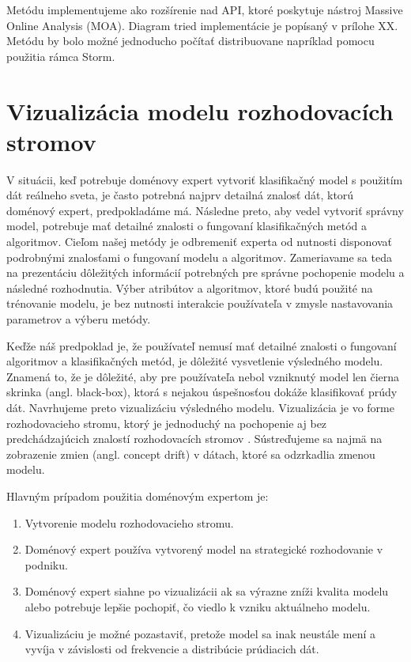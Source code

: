\par
Metódu implementujeme ako rozšírenie nad API, ktoré poskytuje nástroj Massive Online Analysis (MOA). Diagram tried implementácie je popísaný v prílohe XX.%
  Metódu by bolo možné jednoducho počítať distribuovane napríklad pomocu použitia rámca Storm.


\chapter{Vizualizácia modelu rozhodovacích stromov}
\label{my-method-prezentacia-vysledkov}
V situácii, keď potrebuje doménovy expert vytvoriť klasifikačný model s použitím dát reálneho sveta, je často potrebná najprv detailná znalosť dát, ktorú doménový expert, predpokladáme má.  Následne preto, aby vedel vytvoriť správny model, potrebuje mať detailné znalosti o fungovaní klasifikačných metód a algoritmov. Cieľom našej metódy je odbremeniť experta od nutnosti disponovať podrobnými znalosťami o fungovaní modelu a algoritmov. Zameriavame sa teda na prezentáciu dôležitých informácií potrebných pre správne pochopenie modelu a následné rozhodnutia. Výber atribútov a algoritmov, ktoré budú použité na trénovanie modelu, je bez nutnosti interakcie používateľa v zmysle nastavovania parametrov a výberu metódy. 
\par
Keďže náš predpoklad je, že používateľ nemusí mať detailné znalosti o fungovaní algoritmov a klasifikačných metód, je dôležité vysvetlenie výsledného modelu. Znamená to, že je dôležité, aby pre používateľa nebol vzniknutý model len čierna skrinka (angl. black-box), ktorá s nejakou úspešnosťou dokáže klasifikovať prúdy dát. Navrhujeme preto vizualizáciu výsledného modelu. Vizualizácia je vo forme rozhodovacieho stromu, ktorý je jednoduchý na pochopenie aj bez predchádzajúcich znalostí rozhodovacích stromov \citep{nguyen2015survey}. Sústreďujeme sa najmä na zobrazenie zmien (angl. concept drift) v dátach, ktoré sa odzrkadlia zmenou modelu.
\par
Hlavným prípadom použitia doménovým expertom je:
\begin{enumerate}
	\item Vytvorenie modelu rozhodovacieho stromu.
	\item Doménový expert používa vytvorený model na strategické rozhodovanie v podniku.
	\item Doménový expert siahne po vizualizácii ak sa výrazne zníži kvalita modelu alebo potrebuje lepšie pochopiť, čo viedlo k vzniku aktuálneho modelu.
	\item Vizualizáciu je možné pozastaviť, pretože model sa inak neustále mení a vyvíja v závislosti od frekvencie a distribúcie prúdiacich dát.
\end{enumerate}


